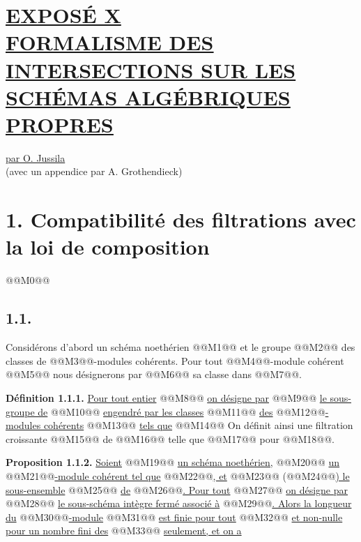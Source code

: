 
\section*{\underline{EXPOSÉ X}\\[3pt] \underline{\underline{FORMALISME DES INTERSECTIONS SUR LES SCHÉMAS ALGÉBRIQUES PROPRES}}}
\begin{center}
\underline{par O. Jussila}\\
(avec un appendice par A. Grothendieck)
\end{center}

\section*{1. Compatibilité des filtrations avec la loi de composition}
@@M0@@

\subsection*{1.1.}
Considérons d'abord un schéma noethérien @@M1@@ et le groupe @@M2@@ des classes de @@M3@@-modules cohérents. Pour tout @@M4@@-module cohérent @@M5@@ nous désignerons par @@M6@@ sa classe dans @@M7@@.

\textbf{Définition 1.1.1.} \uline{Pour tout entier} @@M8@@ \uline{on désigne par} @@M9@@ \uline{le sous-groupe de} @@M10@@ \uline{engendré par les classes} @@M11@@ \uline{des} @@M12@@\uline{-modules cohérents} @@M13@@ \uline{tels que}
@@M14@@
On définit ainsi une filtration croissante @@M15@@ de @@M16@@ telle que @@M17@@ pour @@M18@@.

\textbf{Proposition 1.1.2.} \uline{Soient} @@M19@@ \uline{un schéma noethérien,} @@M20@@ \uline{un} @@M21@@\uline{-module cohérent tel que} @@M22@@\uline{, et} @@M23@@ (@@M24@@\uline{) le sous-ensemble} @@M25@@ \uline{de} @@M26@@\uline{. Pour tout} @@M27@@ \uline{on désigne par} @@M28@@ \uline{le sous-schéma intègre fermé associé à} @@M29@@\uline{. Alors la longueur du} @@M30@@\uline{-module} @@M31@@ \uline{est finie pour tout} @@M32@@ \uline{et non-nulle pour un nombre fini des} @@M33@@ \uline{seulement, et on a}
